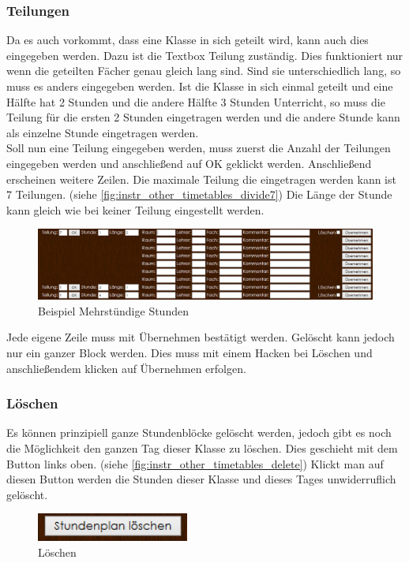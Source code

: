 \subsubsection{Teilungen}
Da es auch vorkommt, dass eine Klasse in sich geteilt wird, kann auch dies eingegeben werden. Dazu ist die Textbox Teilung zuständig. Dies funktioniert nur wenn die geteilten Fächer genau gleich lang sind. Sind sie unterschiedlich lang, so muss es anders eingegeben werden. Ist die Klasse in sich einmal geteilt und eine Hälfte hat 2 Stunden und die andere Hälfte 3 Stunden Unterricht, so muss die Teilung für die ersten 2 Stunden eingetragen werden und die andere Stunde kann als einzelne Stunde eingetragen werden.\\
Soll nun eine Teilung eingegeben werden, muss zuerst die Anzahl der Teilungen eingegeben werden und anschließend auf OK geklickt werden. Anschließend erscheinen weitere Zeilen. Die maximale Teilung die eingetragen werden kann ist 7 Teilungen. (siehe \autoref{fig:instr_other_timetables_divide7}) Die Länge der Stunde kann gleich wie bei keiner Teilung eingestellt werden.
\begin{figure}[H]
\centering
\includegraphics[keepaspectratio=true, width=17cm]{images/screenshots/timetables_input_divide7.png}
\caption{Beispiel Mehrstündige Stunden}
\label{fig:instr_other_timetables_divide7}
\end{figure}
Jede eigene Zeile muss mit Übernehmen bestätigt werden. Gelöscht kann jedoch nur ein ganzer Block werden. Dies muss mit einem Hacken bei Löschen und anschließendem klicken auf Übernehmen erfolgen.
\subsubsection{Löschen}
Es können prinzipiell ganze Stundenblöcke gelöscht werden, jedoch gibt es noch die Möglichkeit den ganzen Tag dieser Klasse zu löschen. Dies geschieht mit dem Button links oben. (siehe \autoref{fig:instr_other_timetables_delete}) Klickt man auf diesen Button werden die Stunden dieser Klasse und dieses Tages unwiderruflich gelöscht.
\begin{figure}[H]
\centering
\includegraphics[keepaspectratio=true, width=5cm]{images/screenshots/timetables_input_delete.png}
\caption{Löschen}
\label{fig:instr_other_timetables_delete}
\end{figure}
